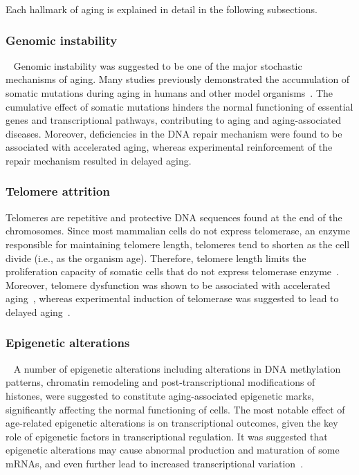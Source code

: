 Each hallmark of aging is explained in detail in the following subsections.
\subsubsection{Genomic instability}~\label{hmark:genomic.instability}
Genomic instability was suggested to be one of the major stochastic mechanisms of aging. 
Many studies previously demonstrated the accumulation of somatic mutations during aging in humans and other model organisms~\autocite{Moskalev2013, Lodato2018, Lombard2005, Vijg2004, Lu2004}.
The cumulative effect of somatic mutations hinders the normal functioning of essential genes and transcriptional pathways, contributing to aging and aging-associated diseases.
Moreover, deficiencies in the DNA repair mechanism were found to be associated with accelerated aging, whereas experimental reinforcement of the repair mechanism resulted in delayed aging.

\subsubsection{Telomere attrition}
Telomeres are repetitive and protective DNA sequences found at the end of the chromosomes.
Since most mammalian cells do not express telomerase, an enzyme responsible for maintaining telomere length, 
telomeres tend to shorten as the cell divide (i.e., as the organism age). 
Therefore, telomere length limits the proliferation capacity of somatic cells that do not express telomerase enzyme~\autocite{Blasco2007}.
Moreover, telomere dysfunction was shown to be associated with accelerated aging~\autocite{Armanios2009}, 
whereas experimental induction of telomerase was suggested to lead to delayed aging~\autocite{Tomas2008}.

\subsubsection{Epigenetic alterations}~\label{hmark:epigenetic}
A number of epigenetic alterations including alterations in DNA methylation patterns, chromatin remodeling and post-transcriptional modifications of histones, 
were suggested to constitute aging-associated epigenetic marks, significantly affecting the normal functioning of cells.
The most notable effect of age-related epigenetic alterations is on transcriptional outcomes, given the key role of epigenetic factors in transcriptional regulation.
It was suggested that epigenetic alterations may cause abnormal production and maturation of some mRNAs, and even further lead to increased transcriptional variation~\autocite{Lopez2013}.

